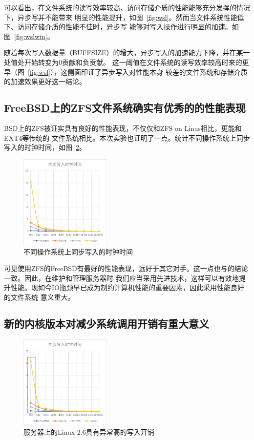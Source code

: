\documentclass[a4paper,twoside]{article}
\begin{document}
\begin{spacing}{1.2}
可以看出，在文件系统的读写效率较高、访问存储介质的性能能够充分发挥的情况下，异步写并不能带来
明显的性能提升，如图~\ref{fig:wsl}。然而当文件系统性能低下、访问存储介质的性能不佳时，异步写
能够对写入操作进行明显的加速。如图~\ref{fig:wslwin}。

随着每次写入数据量（BUFFSIZE）的增大，异步写入的加速能力下降，并在某一处值处开始转变为0贡献和负贡献。
这一阈值在文件系统的读写效率较高时来的更早（图~\ref{fig:wsl}），这侧面印证了异步写入对性能本身
较差的文件系统和存储介质的加速效果更好这一结论。

\subsection{FreeBSD上的ZFS文件系统确实有优秀的的性能表现}

BSD上的ZFS\cite{rodeh2003zfs}被证实具有良好的性能表现，不仅仅和ZFS on Linus相比，更能和EXT4等传统的
文件系统相比\cite{freebsdzfs}。本次实验也证明了一点。统计不同操作系统上同步写入的时钟时间，如图~\ref{fig:allsync}。

\begin{figure}[htb]
	\centering
	\caption{不同操作系统上同步写入的时钟时间}
	\label{fig:allsync}
	\includegraphics[width=0.4\textwidth]{clock.png}
\end{figure}

可见使用ZFS的FreeBSD有最好的性能表现，远好于其它对手。这一点也与\cite{freebsdzfs}的结论一致。因此，在维护和管理服务器时
我们应当采用先进技术，这样可以有效地提升性能。现如今IO瓶颈早已成为制约计算机性能的重要因素，因此采用性能良好的文件系统
意义重大。

\subsection{新的内核版本对减少系统调用开销有重大意义}

\begin{figure}[htb]
	\centering
	\caption{服务器上的Linux 2.6具有异常高的写入开销}
	\label{fig:allsync}
	\includegraphics[width=0.4\textwidth]{clock_high.png}
\end{figure}


\end{spacing}
\end{document}

